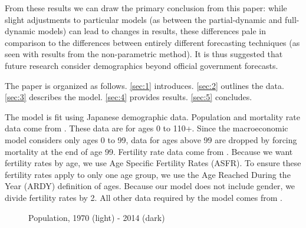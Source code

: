 \documentclass[10pt]{article}
\renewcommand{\thesection}{\arabic{section}}
\renewcommand{\section}[2][]{\oldsection[#1]{#2}\index{#1}\label{sec:\thesection}}
\numberwithin{equation}{subsection}
\newcommand*{\FigureDir}{../../graphs}
\begin{document}
\par From these results we can draw the primary conclusion from this paper: while slight adjustments to particular models (as between the partial-dynamic and full-dynamic models) can lead to changes in results, these differences pale in comparison to the differences between entirely different forecasting techniques (as seen with results from the non-parametric method). It is thus suggested that future research consider demographics beyond official government forecasts.

\par The paper is organized as follows. \autoref{sec:1} introduces. \autoref{sec:2} outlines the data. \autoref{sec:3} describes the model. \autoref{sec:4} provides results. \autoref{sec:5} concludes.


\section{Data}

\par The model is fit using Japanese demographic data. Population and mortality rate data come from \cite{JMD2018}. These data are for ages 0 to 110+. Since the macroeconomic model considers only ages 0 to 99, data for ages above 99 are dropped by forcing mortality at the end of age 99. Fertility rate data come from \cite{HFC2018}. Because we want fertility rates by age, we use Age Specific Fertility Rates (ASFR). To ensure these fertility rates apply to only one age group, we use the Age Reached During the Year (ARDY) definition of ages. Because our model does not include gender, we divide fertility rates by 2. All other data required by the model comes from \cite{E2020}.

\begin{figure}[!ht]
   \centering
   \caption{\label{fig:pop_data}Population, 1970 (light) - 2014 (dark)}
\end{figure}
\end{document}
